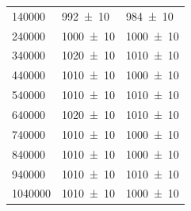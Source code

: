 \begin{center}
\begin{adjustbox}{max width=\linewidth, keepaspectratio}
\begin{tabular}{lll}
            \SI{140000}{}                & \SI{992 \pm 10}{}                                        & \SI{984 \pm 10}{}                                        \\
            \SI{240000}{}                & \SI{1000 \pm 10}{}                                       & \SI{1000 \pm 10}{}                                       \\
            \SI{340000}{}                & \SI{1020 \pm 10}{}                                       & \SI{1010 \pm 10}{}                                       \\
            \SI{440000}{}                & \SI{1010 \pm 10}{}                                       & \SI{1000 \pm 10}{}                                       \\
            \SI{540000}{}                & \SI{1010 \pm 10}{}                                       & \SI{1010 \pm 10}{}                                       \\
            \SI{640000}{}                & \SI{1020 \pm 10}{}                                       & \SI{1010 \pm 10}{}                                       \\
            \SI{740000}{}                & \SI{1010 \pm 10}{}                                       & \SI{1000 \pm 10}{}                                       \\
            \SI{840000}{}                & \SI{1010 \pm 10}{}                                       & \SI{1000 \pm 10}{}                                       \\
            \SI{940000}{}                & \SI{1010 \pm 10}{}                                       & \SI{1010 \pm 10}{}                                       \\
            \SI{1040000}{}               & \SI{1010 \pm 10}{}                                       & \SI{1000 \pm 10}{}                                       \\
            \bottomrule
            \end{tabular}
        \end{adjustbox}
        \label{tab:FrequenzgangKollektorschaltung}
    \end{center}
\endminipage
%
